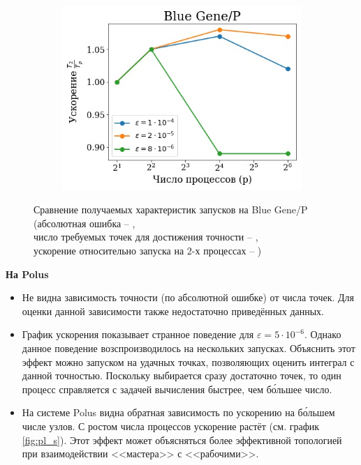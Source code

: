 \documentclass[12pt, fleqn]{article}
\theoremstyle{definition}
\begin{document}
\begin{figure}[ht!]
    \medskip
    \begin{subfigure}[t]{0.45\textwidth}
    \centering
    \vspace{0pt}
        \includegraphics[width=\linewidth]{bluegene_speed.jpg} 
        \caption{}\label{fig:bg_s}
    \end{subfigure}
    \hfill
    \begin{minipage}[t]{.45\textwidth}
    \caption{Сравнение получаемых характеристик запусков на Blue Gene/P \\(абсолютная ошибка -- , \\ число требуемых точек для достижения точности -- ,\\ ускорение относительно запуска на 2-х процессах -- )}
    \label{fig:bg}
    \end{minipage}
    
\end{figure}

\textbf{На Polus}
\begin{itemize}
    \setlength{\itemsep}{1pt}
  \setlength{\parskip}{0pt}
  \setlength{\parsep}{0pt}
 \item Не видна зависимость точности (по абсолютной ошибке) от числа точек. Для оценки данной зависимости также недостаточно приведённых данных.
 \item График ускорения показывает странное поведение для $\varepsilon=5 \cdot 10^{-6}$. Однако данное поведение возспроизводилось на нескольких запусках. Объяснить этот эффект можно запуском на удачных точках, позволяющих оценить интеграл с данной точностью. Поскольку выбирается сразу достаточно точек, то один процесс справляется с задачей вычисления быстрее, чем б\'{ольшее} число.
 \item На системе Polus видна обратная зависимость по ускорению на б\'{о}льшем числе узлов. С ростом числа процессов ускорение растёт (см. график \ref{fig:pl_s}). Этот эффект  может объясняться более эффективной топологией при взаимодействии <<мастера>> с <<рабочими>>.
\end{itemize}
\end{document}
